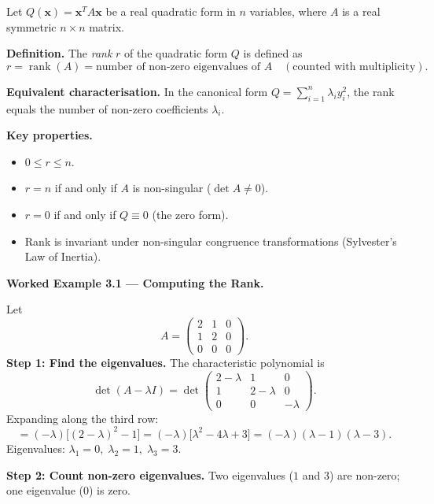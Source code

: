 \documentclass[12pt,a4paper]{article}
\begin{document}
\begin{infobox}
Let \(Q(\mathbf{x}) = \mathbf{x}^{T} A \mathbf{x}\) be a real quadratic form in \(n\)
variables, where \(A\) is a real symmetric \(n \times n\) matrix.

\medskip
\textbf{Definition.} The \emph{rank} \(r\) of the quadratic form \(Q\) is defined as
\[
  r = \operatorname{rank}(A) = \text{number of non-zero eigenvalues of } A
      \quad (\text{counted with multiplicity}).
\]

\medskip
\textbf{Equivalent characterisation.} In the canonical form
\(\displaystyle Q = \sum_{i=1}^{n} \lambda_i y_i^2\), the rank equals the number of
non-zero coefficients \(\lambda_i\).

\medskip
\textbf{Key properties.}
\begin{itemize}[noitemsep]
  \item \(0 \leq r \leq n\).
  \item \(r = n\) if and only if \(A\) is non-singular (\(\det A \neq 0\)).
  \item \(r = 0\) if and only if \(Q \equiv 0\) (the zero form).
  \item Rank is invariant under non-singular congruence transformations
        (Sylvester's Law of Inertia).
\end{itemize}
\end{infobox}

\medskip
\noindent\textbf{Worked Example 3.1 --- Computing the Rank.}

Let
\[
A = \begin{pmatrix} 2 & 1 & 0 \\ 1 & 2 & 0 \\ 0 & 0 & 0 \end{pmatrix}.
\]
\textbf{Step 1: Find the eigenvalues.} The characteristic polynomial is
\[
\det(A - \lambda I) = \det\begin{pmatrix} 2-\lambda & 1 & 0 \\ 1 & 2-\lambda & 0
                           \\ 0 & 0 & -\lambda \end{pmatrix}.
\]
Expanding along the third row:
\[
  = (-\lambda)\bigl[(2-\lambda)^2 - 1\bigr]
  = (-\lambda)\bigl[\lambda^2 - 4\lambda + 3\bigr]
  = (-\lambda)(\lambda - 1)(\lambda - 3).
\]
Eigenvalues: \(\lambda_1 = 0,\; \lambda_2 = 1,\; \lambda_3 = 3\).

\textbf{Step 2: Count non-zero eigenvalues.}
Two eigenvalues (\(1\) and \(3\)) are non-zero; one eigenvalue (\(0\)) is zero.
\end{document}
